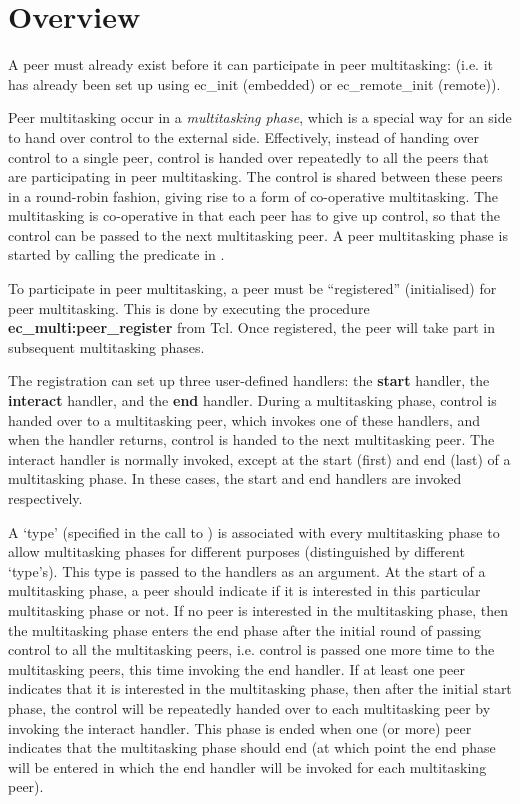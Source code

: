 \section{Overview}
A peer must already exist before it can participate in peer multitasking:
(i.e. it has already been set up using ec_init (embedded) or ec_remote_init (remote)).

Peer multitasking occur in a {\it multitasking phase}, which is a special
way for an {\eclipse} side to hand over control to the external
side. Effectively, instead of handing over control to a single peer,
control is handed over repeatedly to all the peers that are participating
in peer multitasking. The control is shared between these peers in a
round-robin fashion, giving rise to a form of co-operative
multitasking. The multitasking is co-operative in that each peer has to
give up control, so that the control can be passed to the next multitasking
peer. A peer multitasking phase is started by calling the predicate
 in {\eclipse}. 


To participate in peer multitasking, a peer must be ``registered''
(initialised) for peer multitasking. This is done by executing the 
procedure {\bf ec_multi:peer_register}
from Tcl. Once registered, the peer will take part in subsequent
multitasking phases. 


The registration can set up three user-defined handlers: the {\bf
start} handler, the {\bf interact} handler, and the {\bf end} handler.
During a multitasking phase, control is handed over to a multitasking peer,
which invokes
one of these handlers, and when the handler returns, control is handed
to the next multitasking peer. The interact handler is normally invoked,
except at the start (first) and end (last) of a multitasking phase. In
these cases, the start and end handlers are invoked respectively.

A `type' (specified in the call to ) is associated
with every multitasking phase to allow multitasking phases for different
purposes (distinguished by different `type's). This type is passed to the
handlers as an argument. At the start of a multitasking phase, a peer
should indicate if it is interested in this particular multitasking phase
or not. If no peer is interested in the multitasking
phase, then the multitasking phase enters the end phase after the initial
round of passing control to all the multitasking peers, i.e. control is
passed one more time to the multitasking peers, this time invoking the end
handler. If at least one peer indicates that it is interested in the
multitasking phase, then after the initial start phase, the control will be
repeatedly handed over to each multitasking peer by invoking the interact
handler. This phase is ended when one (or more) peer indicates that the
multitasking phase should end (at which point the end phase will be entered
in which the end handler will be invoked for each multitasking peer). 

